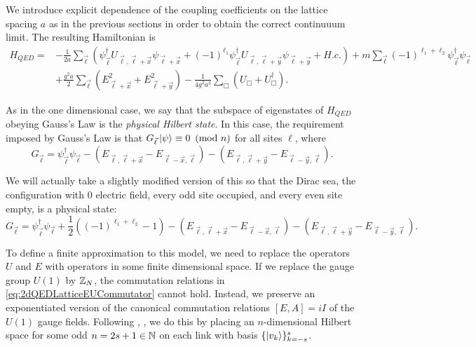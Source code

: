\documentclass[11pt,reqno]{amsart}
\numberwithin{equation}{section}
\begin{document}
	We introduce explicit dependence of the coupling coefficients on the lattice spacing $a$ as in the previous sections in order to obtain the correct continuuum limit.
	The resulting Hamiltonian is
	\begin{align}\label{eq:2dQEDHamiltonianLatticeDepend}
	H_{QED}=&-\frac{1}{2a}\sum_{\vec{\ell}} \left( \psi^\dagger_{\vec{\ell}} U_{\vec{\ell},\vec{\ell}+\vec{x}} \psi_{\vec{\ell}+\vec{x}} + (-1)^{\ell_1} \psi^\dagger_{\vec{\ell}}U_{\vec{\ell},\vec{\ell}+\vec{y}} \psi_{\vec{\ell}+\vec{y}} + H.c. \right) + m\sum_{\vec{\ell}} (-1)^{\ell_1+\ell_2} \psi_{\vec{\ell}}^\dagger \psi_{\vec{\ell}} \nonumber \\
	&+ \frac{g^2a}{2} \sum_{\vec{\ell}} \left(E^2_{\vec{\ell}+\vec{x}}+E^2_{\vec{\ell}+\vec{y}}\right) - \frac{1}{4g^2a^3} \sum_{\Box} (U_\Box + U_\Box^\dagger).
	\end{align}	
	
	As in the one dimensional case, we say that the subspace of eigenstates of $H_{QED}$ obeying Gauss's Law is the \emph{physical Hilbert state}. 
	In this case, the requirement imposed by Gauss's Law is that $G_{\vec{\ell}}\ket{\psi} \equiv 0 \ \left(\mathrm{mod}\ n\right)$ for all sites $\ell$, where
	\begin{equation}
		G_{\vec{\ell}}=\psi_{\vec{\ell}}^\dagger\psi_{\vec{\ell}} - ( E_{\vec{\ell},\vec{\ell}+\vec{x}} - E_{\vec{\ell}-\vec{x},\vec{\ell}}) - ( E_{\vec{\ell},\vec{\ell}+\vec{y}} - E_{\vec{\ell}-\vec{y},\vec{\ell}} ).
	\end{equation}
	
	We will actually take a slightly modified version of this so that the Dirac sea, the configuration with 0 electric field, every odd site occupied, and every even site empty, is a physical state:
	\begin{equation}\label{eq:2dQEDGaussLaw}
		G_{\vec{\ell}}=\psi_{\vec{\ell}}^\dagger\psi_{\vec{\ell}} + \frac{1}{2}((-1)^{\ell_1+\ell_2}-1) - ( E_{\vec{\ell},\vec{\ell}+\vec{x}} - E_{\vec{\ell}-\vec{x},\vec{\ell}}) - ( E_{\vec{\ell},\vec{\ell}+\vec{y}} - E_{\vec{\ell}-\vec{y},\vec{\ell}} ).
	\end{equation}
	
	To define a finite approximation to this model, we need to replace the operators $U$ and $E$ with operators in some finite dimensional space. 
	If we replace the gauge group $U(1)$ by $\mathbb{Z}_N$, the commutation relations in \cref{eq:2dQEDLatticeEUCommutator} cannot hold.
	Instead, we preserve an exponentiated version of the canonical commutation relations $[E,A]=iI$ of the $U(1)$ gauge fields.
	Following \cite{Ercolessi18}, \cite{Notarnicola15}, we do this by placing an $n$-dimensional Hilbert space for some odd $n=2s+1\in \mathbb{N}$ on each link with basis $\{\ket{v_k}\}_{k=-s}^{s}$.
	
\end{document}
